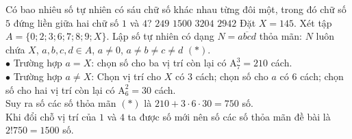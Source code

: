 \begin{ex}%
Có bao nhiêu số tự nhiên có sáu chữ số khác nhau từng đôi một, trong đó chữ số $5$ đứng liền giữa hai chữ số $1$ và $4$?
\choice
{$249$}
{\True $1500$}
{$3204$}
{$2942$}
\loigiai
{Đặt $X=145$. Xét tập $A=\{0; 2; 3; 6; 7; 8; 9; X\}$. Lập số tự nhiên có dạng $N=\overline{abcd}$ thỏa mãn: $N$ luôn chứa $X$, $a, b, c, d\in A$, $a\neq 0$, $a\neq b\neq c\neq d$ $(*)$.\\
$\bullet$ Trường hợp $a=X$: chọn số cho ba vị trí còn lại có $\mathrm{A}^3_7=210$ cách.\\
$\bullet$ Trường hợp $a\neq X$: Chọn vị trí cho $X$ có $3$ cách; chọn số cho $a$ có $6$ cách; chọn số cho hai vị trí còn lại có $\mathrm{A}^2_6=30$ cách.\\
Suy ra số các số thỏa mãn $(*)$ là $210+3\cdot 6\cdot 30=750$ số.\\
Khi đổi chỗ vị trí của $1$ và $4$ ta được số mới nên số các số thỏa mãn đề bài là $2!750=1500$ số.
}
\end{ex}


